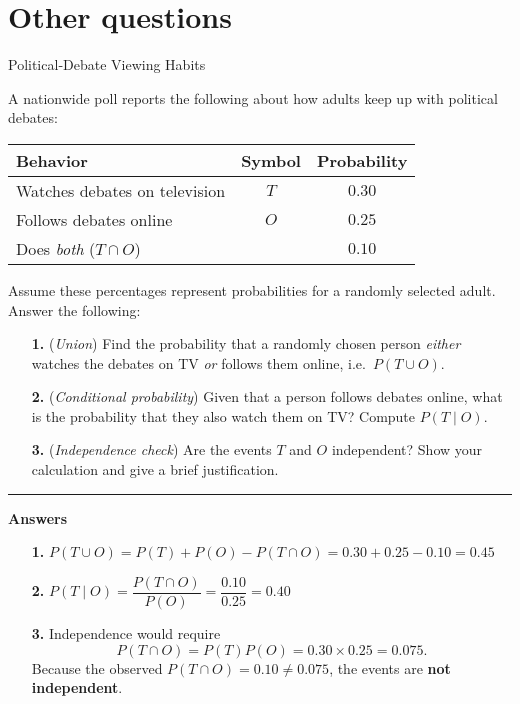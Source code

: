 \documentclass{article}
\begin{document}
\section*{Other questions}

Political‐Debate Viewing Habits

A nationwide poll reports the following about how adults keep up with political debates:

\begin{center}
\begin{tabular}{lcc}
\toprule
\textbf{Behavior} & \textbf{Symbol} & \textbf{Probability} \\ \midrule
Watches debates on television & $T$ & $0.30$ \\
Follows debates online        & $O$ & $0.25$ \\
Does \emph{both} ($T\cap O$)   &  & $0.10$ \\ \bottomrule
\end{tabular}
\end{center}

Assume these percentages represent probabilities for a randomly selected adult.  Answer the following:

\begin{enumerate}
  \item[\textbf{1.}] (\emph{Union})\; Find the probability that a randomly chosen person \emph{either} watches the debates on TV \emph{or} follows them online, i.e.\ $P(T\cup O)$.
  \item[\textbf{2.}] (\emph{Conditional probability})\; Given that a person follows debates online, what is the probability that they also watch them on TV?  Compute $P(T \mid O)$.
  \item[\textbf{3.}] (\emph{Independence check})\; Are the events $T$ and $O$ independent?  Show your calculation and give a brief justification.
\end{enumerate}

\vspace{1em}
\hrule
\vspace{1em}

\textbf{Answers}

\begin{enumerate}
  \item[\textbf{1.}] $P(T\cup O)=P(T)+P(O)-P(T\cap O)=0.30+0.25-0.10=0.45$
  \item[\textbf{2.}] $P(T\mid O)=\dfrac{P(T\cap O)}{P(O)}=\dfrac{0.10}{0.25}=0.40$
  \item[\textbf{3.}] Independence would require 
    \[
      P(T\cap O)=P(T)P(O)=0.30\times 0.25=0.075.
    \]
    Because the observed $P(T\cap O)=0.10\neq 0.075$, the events are \textbf{not independent}.
\end{enumerate}
\end{document}
